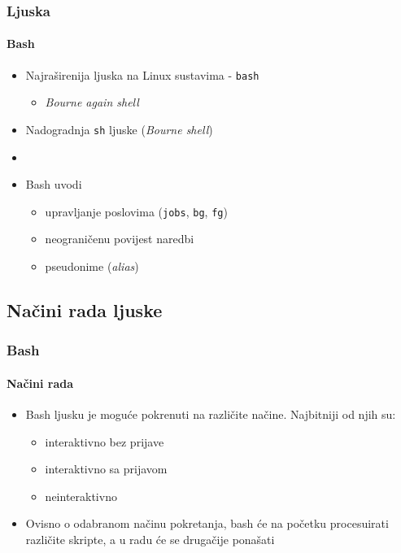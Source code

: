 \documentclass[table,usenames,dvipsnames]{beamer}
\newcommand{\shell}[1]{\texttt{#1}}
\begin{document}
\begin{frame}[t]
	\frametitle{Ljuska}
	\framesubtitle{Bash}
	\begin{itemize}
		\item Najraširenija ljuska na Linux sustavima - \shell{bash}
		\begin{itemize}
			\item \emph{Bourne again shell}
		\end{itemize}
		\item Nadogradnja \shell{sh} ljuske (\emph{Bourne shell})
		\item[]
		\item Bash uvodi
		\begin{itemize}
			\item upravljanje poslovima (\shell{jobs}, \shell{bg}, \shell{fg})
			\item neograničenu povijest naredbi
			\item pseudonime (\emph{alias})
		\end{itemize}
	\end{itemize}
\end{frame}

\subsection{Načini rada ljuske}
\begin{frame}[t]
	\frametitle{Bash}
	\framesubtitle{Načini rada}
	\begin{itemize}
		\item Bash ljusku je moguće pokrenuti na različite načine. Najbitniji od njih su:
		\begin{itemize}
			\item interaktivno bez prijave
			\item interaktivno sa prijavom
			\item neinteraktivno
		\end{itemize}
		\item Ovisno o odabranom načinu pokretanja, bash će na početku procesuirati različite skripte, a u radu će se drugačije ponašati
	\end{itemize}
\end{frame}
\end{document}
